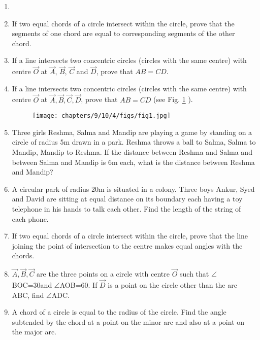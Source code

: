 \begin{enumerate}[label=\thesection.\arabic*,ref=\thesection.\theenumi]
\item 
\label{chapters/9/10/4/1}

\item If two equal chords of a circle intersect within the circle, prove 
that the segments of one chord are equal to corresponding segments of the other 
chord.
\label{chapters/9/10/4/2}
\\
\solution 

\item If a line intersects two concentric circles (circles
with the same centre) with centre $\vec{O}$ at $\vec{A}$, $\vec{B}$, $\vec{C}$ and $\vec{D}$, prove that $AB = CD$.
		\label{chapters/9/10/4/4/}
\\
\solution 

\item If a line intersects two concentric circles (circles with the same 
centre) with centre $\vec{O}$ at $\vec{A}, \vec{B}, \vec{C}, \vec{D}$, prove 
that $AB = CD$ (see Fig. 
		\ref{fig:chapters/9/10/41} ).
\begin{figure}[!ht]
    \centering
    \texttt{[image: chapters/9/10/4/figs/fig1.jpg]}
    \caption{}
    \label{fig:chapters/9/10/41}
\end{figure}
\item Three girls Reshma, Salma and Mandip are playing a game by standing on 
a circle of radius 5m drawn in a park. Reshma throws a ball to Salma, Salma to 
Mandip, Mandip to Reshma. If the distance between Reshma and Salma and between 
Salma and Mandip is 6m each, what is the distance between Reshma and Mandip?
\\
\solution 

\item A circular park of radius 20m is situated in a colony. Three boys Ankur,
Syed and David are sitting at equal distance on its boundary each having a toy 
telephone in his hands to talk each other. Find the length of the string of each 
phone.
\item If two equal chords of a circle intersect within the circle, prove 
that the line joining the point of intersection to the centre makes equal 
angles with the chords.
\label{chapters/9/10/4/6}
\\
\solution 
%

\item  $\vec{A},\vec{B},\vec{C}$ are the three points on a circle with centre $\vec{O}$ such that $\angle$BOC=30\degree and $\angle$AOB=60\degree. If $\vec{D}$ is a point on the circle other than the arc ABC, find $\angle$ADC.
\label{chapters/9/10/5/1}
\\
\solution

\item A chord of a circle is equal to the radius of the circle. Find the angle subtended by the chord at a point on the minor arc and also at a point on the major arc.
\label{chapters/9/10/5/2}
\\
\solution



\end{enumerate}
